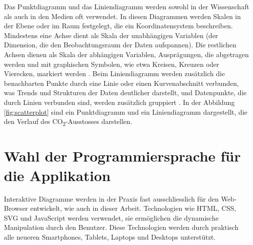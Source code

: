 Das Punktdiagramm und das Liniendiagramm werden sowohl in der Wissenschaft als auch in den Medien oft verwendet. In diesen Diagrammen werden Skalen in der Ebene oder im Raum festgelegt, die ein Koordinatensystem beschreiben. Mindestens eine Achse dient als Skala der unabhängigen Variablen (der Dimension, die den Beobachtungsraum der Daten aufspannen). Die restlichen Achsen dienen als Skala der abhängigen Variablen, Ausprägungen, die abgetragen werden und mit graphischen Symbolen, wie etwa Kreisen, Kreuzen oder Vierecken, markiert werden \cite{viz}. Beim Liniendiagramm werden zusätzlich die benachbarten Punkte durch eine Linie oder einen Kurvenabschnitt verbunden, was Trends und Strukturen der Daten deutlicher darstellt, und Datenpunkte, die durch Linien verbunden sind, werden zusätzlich gruppiert \cite{viz}. In der Abbildung \ref{fig:scatterplot} sind ein Punktdiagramm und ein Liniendiagramm dargestellt, die den Verlauf des CO\textsubscript{2}-Ausstosses darstellen.

\section{Wahl der Programmiersprache für die Applikation}

Interaktive Diagramme werden in der Praxis fast ausschliesslich für den Web-Browser entwickelt, wie auch in dieser Arbeit. Technologien wie HTML, CSS, SVG und JavaScript werden verwendet, sie ermöglichen die dynamische Manipulation durch den Benutzer. Diese Technologien werden durch praktisch alle neueren Smartphones, Tablets, Laptops und Desktops unterstützt.
